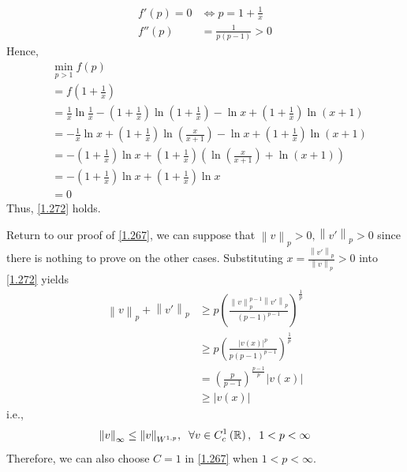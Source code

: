 \documentclass[a4paper,oneside]{book}
\numberwithin{equation}{chapter}
\begin{document}
\begin{enumerate}
\begin{align}
f'\left( p \right) = 0 &\Leftrightarrow p = 1 + \frac{1}{x}\\
f''\left( p \right) &= \frac{1}{{p\left( {p - 1} \right)}} > 0
\end{align}
Hence, 
\begin{align}
&\mathop {\min }\limits_{p > 1} f\left( p \right)\\
 &= f\left( {1 + \frac{1}{x}} \right)\\
& = \frac{1}{x}\ln \frac{1}{x} - \left( {1 + \frac{1}{x}} \right)\ln \left( {1 + \frac{1}{x}} \right) - \ln x + \left( {1 + \frac{1}{x}} \right)\ln \left( {x + 1} \right)\\
& =  - \frac{1}{x}\ln x + \left( {1 + \frac{1}{x}} \right)\ln \left( {\frac{x}{{x + 1}}} \right) - \ln x + \left( {1 + \frac{1}{x}} \right)\ln \left( {x + 1} \right)\\
& =  - \left( {1 + \frac{1}{x}} \right)\ln x + \left( {1 + \frac{1}{x}} \right)\left( {\ln \left( {\frac{x}{{x + 1}}} \right) + \ln \left( {x + 1} \right)} \right)\\
& =  - \left( {1 + \frac{1}{x}} \right)\ln x + \left( {1 + \frac{1}{x}} \right)\ln x\\
 &= 0
\end{align}
Thus, \eqref{1.272} holds. 

Return to our proof of \eqref{1.267}, we can suppose that ${\left\| v \right\|_p} > 0,{\left\| {v'} \right\|_p} > 0$ since there is nothing to prove on the other cases. Substituting $x = \frac{{{{\left\| {v'} \right\|}_p}}}{{{{\left\| v \right\|}_p}}} >0$ into \eqref{1.272} yields
\begin{align}
{\left\| v \right\|_p} + {\left\| {v'} \right\|_p} &\ge p{\left( {\frac{{\left\| v \right\|_p^{p - 1}{{\left\| {v'} \right\|}_p}}}{{{{\left( {p - 1} \right)}^{p - 1}}}}} \right)^{\frac{1}{p}}}\\
& \ge p{\left( {\frac{{{{\left| {v\left( x \right)} \right|}^p}}}{{p{{\left( {p - 1} \right)}^{p - 1}}}}} \right)^{\frac{1}{p}}}\\
& = {\left( {\frac{p}{{p - 1}}} \right)^{\frac{{p - 1}}{p}}}\left| {v\left( x \right)} \right|\\
& \ge \left| {v\left( x \right)} \right|
\end{align}
i.e., 
\begin{align}
{\left\| v \right\|_\infty } \le {\left\| v \right\|_{{W^{1,p}}}},\hspace{0.2cm}\forall v \in C_c^1\left( \mathbb{R} \right),\hspace{0.2cm} 1<p<\infty
\end{align}
Therefore, we can also choose $C=1$ in \eqref{1.267} when $1<p< \infty$.
\end{enumerate}
\end{document}
